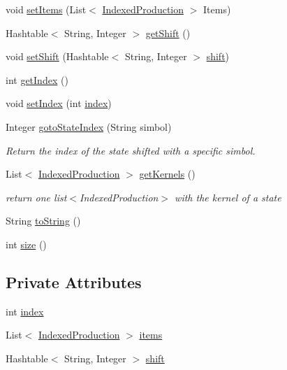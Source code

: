 \begin{DoxyCompactItemize}
\item 
void \hyperlink{classcontext_free_1_1parser_1_1_state_ac5d2c09a67b8bba054456a652964735e}{set\-Items} (List$<$ \hyperlink{classcontext_free_1_1parser_1_1_indexed_production}{Indexed\-Production} $>$ Items)
\item 
Hashtable$<$ String, Integer $>$ \hyperlink{classcontext_free_1_1parser_1_1_state_a0a46dd3cf055c0aa7951b4df93daf23e}{get\-Shift} ()
\item 
void \hyperlink{classcontext_free_1_1parser_1_1_state_a391213320b8ca96be1ede02b449662c7}{set\-Shift} (Hashtable$<$ String, Integer $>$ \hyperlink{classcontext_free_1_1parser_1_1_state_a7448df2a60c1a493b1305d6d46ceecc6}{shift})
\item 
int \hyperlink{classcontext_free_1_1parser_1_1_state_a2548bf6b7febee3cf305edb33cac19ca}{get\-Index} ()
\item 
void \hyperlink{classcontext_free_1_1parser_1_1_state_a5ae06a15397a64125c28fd64f5985008}{set\-Index} (int \hyperlink{classcontext_free_1_1parser_1_1_state_ade54fdccdfdced9a3b03c886dbd4bf9e}{index})
\item 
Integer \hyperlink{classcontext_free_1_1parser_1_1_state_abaac15576397224a4495d8198cfe2f1d}{goto\-State\-Index} (String simbol)
\begin{DoxyCompactList}\small\item\em Return the index of the state shifted with a specific simbol. \end{DoxyCompactList}\item 
List$<$ \hyperlink{classcontext_free_1_1parser_1_1_indexed_production}{Indexed\-Production} $>$ \hyperlink{classcontext_free_1_1parser_1_1_state_a1afb2f9faa5ec548897e44cc863389ba}{get\-Kernels} ()
\begin{DoxyCompactList}\small\item\em return one list$<$\-Indexed\-Production$>$ with the kernel of a state \end{DoxyCompactList}\item 
String \hyperlink{classcontext_free_1_1parser_1_1_state_aa480857783a31a4b8ab22f6a92b0f142}{to\-String} ()
\item 
int \hyperlink{classcontext_free_1_1parser_1_1_state_a6a9e16086ce29535a3e63caadb35a532}{size} ()
\end{DoxyCompactItemize}
\subsection*{Private Attributes}
\begin{DoxyCompactItemize}
\item 
int \hyperlink{classcontext_free_1_1parser_1_1_state_ade54fdccdfdced9a3b03c886dbd4bf9e}{index}
\item 
List$<$ \hyperlink{classcontext_free_1_1parser_1_1_indexed_production}{Indexed\-Production} $>$ \hyperlink{classcontext_free_1_1parser_1_1_state_ac62b4e843a6a61d6166f1aae98171854}{items}
\item 
Hashtable$<$ String, Integer $>$ \hyperlink{classcontext_free_1_1parser_1_1_state_a7448df2a60c1a493b1305d6d46ceecc6}{shift}
\end{DoxyCompactItemize}


